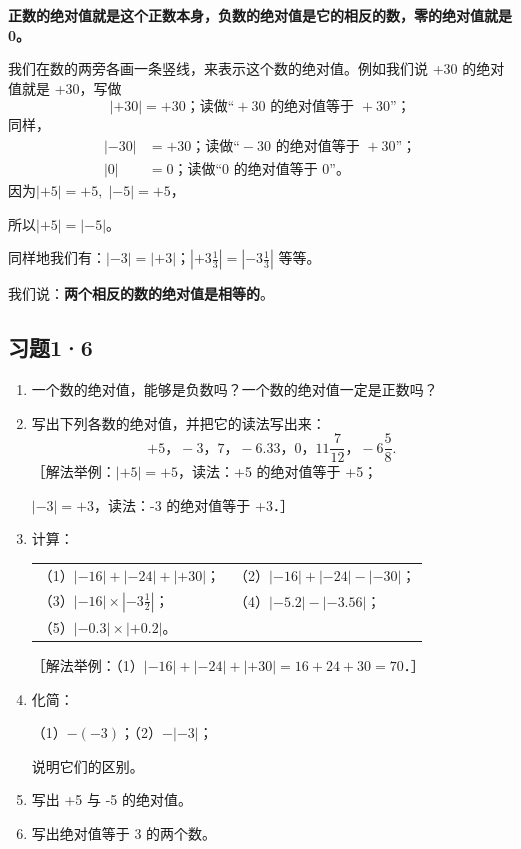 \textbf{正数的绝对值就是这个正数本身，负数的绝对值是它的相反的数，零的绝对值就是 0。}

我们在数的两旁各画一条竖线，来表示这个数的绝对值。例如我们说 +30 的绝对值就是 +30，写做
\[
|+30| = +30\text{；读做“}+30\text{ 的绝对值等于 }+30\text{”；}
\]
同样，
\[
\begin{aligned}
|-30| &= +30\text{；读做“}-30\text{ 的绝对值等于 }+30\text{”；} \\
|0| &= 0\text{；读做“}0\text{ 的绝对值等于 }0\text{”。}
\end{aligned}
\]
因为\quad \(|+5| = +5,\; |-5| = +5\)，
\par
所以\quad \(|+5| = |-5|\)。

同样地我们有：\(|-3| = |+3|\)；\(\left|+3\frac{1}{3}\right| = \left|-3\frac{1}{3}\right|\) 等等。

我们说：\textbf{两个相反的数的绝对值是相等的}。

\subsection{习题1·6}

\begin{enumerate}
\item
  一个数的绝对值，能够是负数吗？一个数的绝对值一定是正数吗？
\item
  写出下列各数的绝对值，并把它的读法写出来：
  \[
  +5\text{，} -3\text{，} 7\text{，} -6.33\text{，} 0\text{，} 11\frac{7}{12}\text{，} -6\frac{5}{8}.
  \]
  ［解法举例：\(|+5| = +5\)，读法：+5 的绝对值等于 +5；
  \par
  \phantom{［解法举例：}\(|-3| = +3\)，读法：-3 的绝对值等于 +3．］
\item
  计算：
  \par\smallskip
  \begin{tabular}{@{}ll@{}}
  （1）\(|-16| + |-24| + |+30|\)； & （2）\(|-16| + |-24| - |-30|\)； \\[4pt]
  （3）\(|-16| \times \left|-3\frac{1}{2}\right|\)； & （4）\(|-5.2| - |-3.56|\)； \\[4pt]
  （5）\(|-0.3| \times |+0.2|\)。 &
  \end{tabular}
  \par\smallskip
  ［解法举例：（1）\(|-16| + |-24| + |+30| = 16 + 24 + 30 = 70\)．］
\item
  化简：
  \par\smallskip
  （1）\(-(-3)\)；\qquad（2）\(-|-3|\)；
  \par
  说明它们的区别。
\item
  写出 +5 与 -5 的绝对值。
\item
  写出绝对值等于 3 的两个数。
\end{enumerate}

